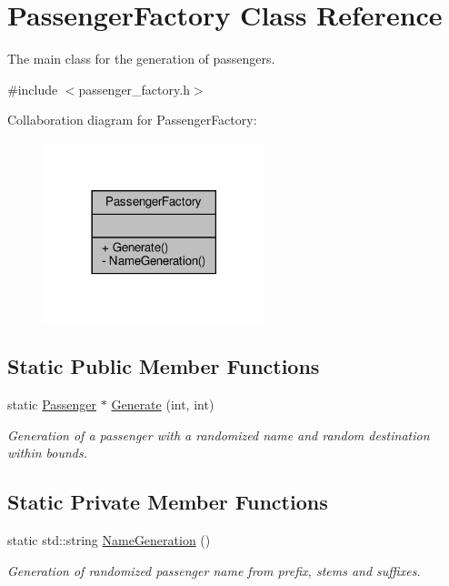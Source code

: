 \hypertarget{classPassengerFactory}{}\section{Passenger\+Factory Class Reference}
\label{classPassengerFactory}


The main class for the generation of passengers.  




{\ttfamily \#include $<$passenger\+\_\+factory.\+h$>$}



Collaboration diagram for Passenger\+Factory\+:\nopagebreak
\begin{figure}[H]
\begin{center}
\leavevmode
\includegraphics[width=182pt]{classPassengerFactory__coll__graph}
\end{center}
\end{figure}
\subsection*{Static Public Member Functions}
\begin{DoxyCompactItemize}
\item 
static \hyperlink{classPassenger}{Passenger} $\ast$ \hyperlink{classPassengerFactory_a2952ba78ceb285f445bc768d287230d2}{Generate} (int, int)
\begin{DoxyCompactList}\small\item\em Generation of a passenger with a randomized name and random destination within bounds. \end{DoxyCompactList}\end{DoxyCompactItemize}
\subsection*{Static Private Member Functions}
\begin{DoxyCompactItemize}
\item 
static std\+::string \hyperlink{classPassengerFactory_ab45108c1c01146f2b07cc5977048d540}{Name\+Generation} ()
\begin{DoxyCompactList}\small\item\em Generation of randomized passenger name from prefix, stems and suffixes. \end{DoxyCompactList}\end{DoxyCompactItemize}


